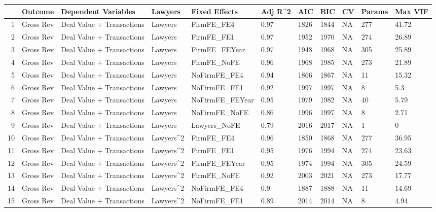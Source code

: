 \begin{table}[ht]
\centering
\begin{tabular}{rllllllllll}
  \hline
 & Outcome & Dependent Variables & Lawyers & Fixed Effects & Adj R^2 & AIC & BIC & CV & Params & Max VIF \\ 
  \hline
1 & Gross Rev & Deal Value + Transactions & Lawyers & FirmFE\_FE4 & 0.97 & 1826 & 1844 & NA & 277 & 41.72 \\ 
  2 & Gross Rev & Deal Value + Transactions & Lawyers & FirmFE\_FE1 & 0.97 & 1952 & 1970 & NA & 274 & 26.89 \\ 
  3 & Gross Rev & Deal Value + Transactions & Lawyers & FirmFE\_FEYear & 0.97 & 1948 & 1968 & NA & 305 & 25.89 \\ 
  4 & Gross Rev & Deal Value + Transactions & Lawyers & FirmFE\_NoFE & 0.96 & 1968 & 1985 & NA & 273 & 21.89 \\ 
  5 & Gross Rev & Deal Value + Transactions & Lawyers & NoFirmFE\_FE4 & 0.94 & 1866 & 1867 & NA & 11 & 15.32 \\ 
  6 & Gross Rev & Deal Value + Transactions & Lawyers & NoFirmFE\_FE1 & 0.92 & 1997 & 1997 & NA & 8 & 5.3 \\ 
  7 & Gross Rev & Deal Value + Transactions & Lawyers & NoFirmFE\_FEYear & 0.95 & 1979 & 1982 & NA & 40 & 5.79 \\ 
  8 & Gross Rev & Deal Value + Transactions & Lawyers & NoFirmFE\_NoFE & 0.86 & 1996 & 1997 & NA & 8 & 2.71 \\ 
  9 & Gross Rev & Deal Value + Transactions & Lawyers & Lawyers\_NoFE & 0.79 & 2016 & 2017 & NA & 1 & 0 \\ 
  10 & Gross Rev & Deal Value + Transactions & Lawyers^2 & FirmFE\_FE4 & 0.96 & 1850 & 1868 & NA & 277 & 36.95 \\ 
  11 & Gross Rev & Deal Value + Transactions & Lawyers^2 & FirmFE\_FE1 & 0.95 & 1976 & 1994 & NA & 274 & 23.63 \\ 
  12 & Gross Rev & Deal Value + Transactions & Lawyers^2 & FirmFE\_FEYear & 0.95 & 1974 & 1994 & NA & 305 & 24.59 \\ 
  13 & Gross Rev & Deal Value + Transactions & Lawyers^2 & FirmFE\_NoFE & 0.92 & 2003 & 2021 & NA & 273 & 17.77 \\ 
  14 & Gross Rev & Deal Value + Transactions & Lawyers^2 & NoFirmFE\_FE4 & 0.9 & 1887 & 1888 & NA & 11 & 14.69 \\ 
  15 & Gross Rev & Deal Value + Transactions & Lawyers^2 & NoFirmFE\_FE1 & 0.89 & 2014 & 2014 & NA & 8 & 4.94 \\ 

\end{tabular}
\end{table}
